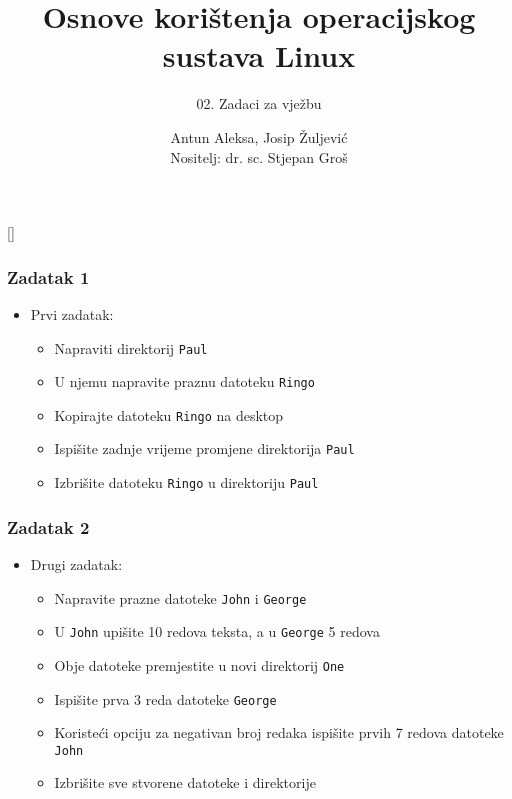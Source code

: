 \documentclass{beamer}
\title{Osnove korištenja operacijskog sustava Linux}
\subtitle{02. Zadaci za vježbu}
\author[Antun Aleksa, Josip Žuljević]{Antun Aleksa, Josip Žuljević\\{\small Nositelj: dr. sc. Stjepan Groš}}
\institute[FER]{Sveučilište u Zagrebu \\
				Fakultet elektrotehnike i računarstva}
\date{\todayiso}
\newcommand{\shell}[1]{\texttt{#1}}
\begin{document}
{
[] %

\begin{frame}
\maketitle
\end{frame}
}

\begin{frame}[t]
\frametitle{Zadatak 1}
\begin{itemize}
  \item Prvi zadatak:
  \begin{itemize}
		\item Napraviti direktorij \shell{Paul}
		\item U njemu napravite praznu datoteku \shell{Ringo}
		\item Kopirajte datoteku \shell{Ringo} na desktop
		\item Ispišite zadnje vrijeme promjene direktorija \shell{Paul}
		\item Izbrišite datoteku \shell{Ringo} u direktoriju \shell{Paul}
  \end{itemize}
\end{itemize}
\end{frame}

\begin{frame}[t]
\frametitle{Zadatak 2}
\begin{itemize}
	\item Drugi zadatak:
	\begin{itemize}
		\item Napravite prazne datoteke \shell{John} i \shell{George}
		\item U \shell{John} upišite 10 redova teksta, a u \shell{George} 5 redova
		\item Obje datoteke premjestite u novi direktorij \shell{One}
		\item Ispišite prva 3 reda datoteke \shell{George}
		\item Koristeći opciju za negativan broj redaka ispišite prvih 7 redova datoteke \shell{John}
		\item Izbrišite sve stvorene datoteke i direktorije
	\end{itemize}
\end{itemize}
\end{frame}
\end{document}
